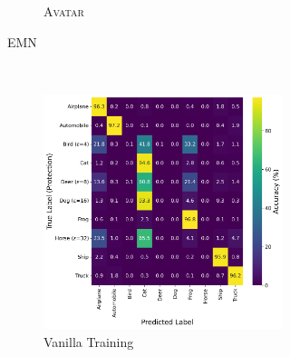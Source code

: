 \documentclass[conference]{IEEEtran}
\theoremstyle{definition}
\theoremstyle{remark}
\theoremstyle{proposition}
\begin{document}
\begin{figure}[tb!]
\begin{subfigure}{1.0\textwidth}
\begin{subfigure}{.40\textwidth}
            \caption*{\textsc{Avatar}}
    	\end{subfigure}
	\caption{EMN~\citep{huang2021emn}}
    \vspace*{2em}
    \end{subfigure}
    \\
    \begin{subfigure}{1.0\textwidth}
    \centering
        \begin{subfigure}{.40\textwidth}
    		\centering
    		\includegraphics[width=1.0\textwidth]{combination_attacks/ResNet18_ADV_eps_combo_t_0_confusion_matrix.png}
            \caption*{Vanilla Training}
    	\end{subfigure}
     \hspace{5em}
        \begin{subfigure}{.40\textwidth}
    		\centering

\end{subfigure}
\end{subfigure}
\end{figure}
\end{document}
